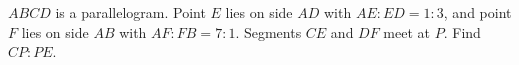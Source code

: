 $ABCD$ is a parallelogram. Point $E$ lies on side $AD$ with $AE:ED=1:3$, and point $F$ lies on side $AB$ with $AF:FB=7:1$. Segments $CE$ and $DF$ meet at $P$. Find $CP:PE$.
